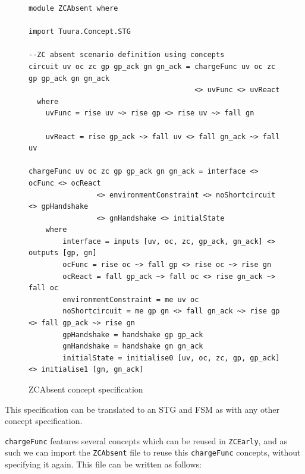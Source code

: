 \documentclass[british,technote,compsoc]{IEEEtran}
\begin{document}
\begin{figure}[H]
\begin{centering}

\begin{verbatim}
module ZCAbsent where

import Tuura.Concept.STG

--ZC absent scenario definition using concepts
circuit uv oc zc gp gp_ack gn gn_ack = chargeFunc uv oc zc gp gp_ack gn gn_ack
                                       <> uvFunc <> uvReact
  where
    uvFunc = rise uv ~> rise gp <> rise uv ~> fall gn

    uvReact = rise gp_ack ~> fall uv <> fall gn_ack ~> fall uv

chargeFunc uv oc zc gp gp_ack gn gn_ack = interface <> ocFunc <> ocReact
                <> environmentConstraint <> noShortcircuit <> gpHandshake
                <> gnHandshake <> initialState
    where
        interface = inputs [uv, oc, zc, gp_ack, gn_ack] <> outputs [gp, gn]
        ocFunc = rise oc ~> fall gp <> rise oc ~> rise gn
        ocReact = fall gp_ack ~> fall oc <> rise gn_ack ~> fall oc
        environmentConstraint = me uv oc
        noShortcircuit = me gp gn <> fall gn_ack ~> rise gp <> fall gp_ack ~> rise gn
        gpHandshake = handshake gp gp_ack
        gnHandshake = handshake gn gn_ack
        initialState = initialise0 [uv, oc, zc, gp, gp_ack] <> initialise1 [gn, gn_ack]

\end{verbatim}

\par\end{centering}

\begin{centering}
\protect\caption{\label{fig:concepts_file}ZCAbsent concept specification}

\par\end{centering}

\end{figure}

This specification can be translated to an STG and FSM as with any other concept specification. 

\texttt{chargeFunc} features several concepts which can be reused in \texttt{ZCEarly}, and as such we can import the \texttt{ZCAbsent} file to reuse this \texttt{chargeFunc} concepts,
without specifying it again. This file can be written as follows:
\end{document}
